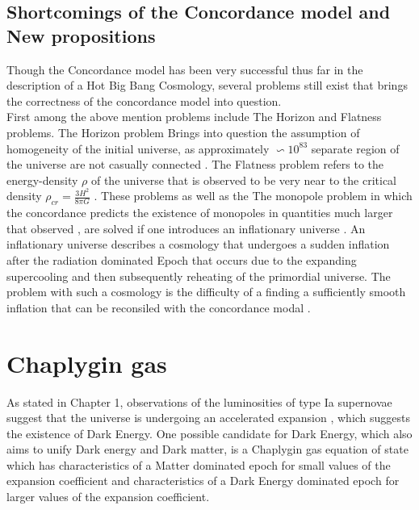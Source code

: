 \documentclass[a4paper, 11pt]{FSKH_623_Report}
\numberwithin{equation}{section}
\begin{document}
\section{Shortcomings of the Concordance model and New propositions}
Though the Concordance model has been very successful thus far in the description of a Hot Big Bang Cosmology, several problems still exist that brings the correctness of the concordance model into question. \\
First among the above mention problems include The Horizon and Flatness problems. The Horizon problem Brings into question the assumption of homogeneity of the initial universe, as approximately $\backsim 10^{83}$ separate region of the universe are not casually connected \citep{IU}. The Flatness problem refers to the   energy-density $\rho$ of the universe that is observed to be very near to the critical density $\rho_{cr}=\frac{3H^{2}}{8\pi G}$ \citep{GRES, IU}. These problems as well as the The monopole problem in which the concordance predicts the existence of monopoles in quantities much larger that observed , are solved if one introduces an inflationary universe \citep{IU}. An inflationary universe describes a cosmology that undergoes a sudden inflation after the radiation dominated Epoch that occurs due to the expanding supercooling and then subsequently reheating of the primordial universe. The problem with such a cosmology is the difficulty of a finding a sufficiently smooth inflation that can be reconsiled with the concordance modal \citep{IU}.\\

\chapter{Chaplygin gas}
As stated in Chapter 1, observations of the luminosities of type Ia supernovae suggest that the universe is undergoing an accelerated expansion \citep{NPSNe, RMCGAU}, which suggests the existence of Dark Energy. One possible candidate for Dark Energy, which also aims to unify Dark energy and Dark matter, is a Chaplygin gas equation of state which has characteristics of a Matter dominated epoch for small values of the expansion coefficient and characteristics of a Dark Energy dominated epoch for larger values of the expansion coefficient.
\end{document}
